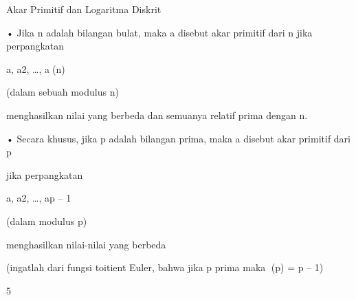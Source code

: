 \documentclass{article}
\begin{document}

Akar Primitif dan Logaritma Diskrit

• Jika n adalah bilangan bulat, maka a disebut akar primitif dari n jika perpangkatan 

a, a2, …, a(n)

(dalam sebuah modulus n) 

    menghasilkan nilai yang berbeda dan semuanya relatif prima dengan n.

• Secara khusus, jika p adalah bilangan prima, maka a disebut akar primitif dari p 

jika perpangkatan 

a, a2, …, ap – 1

(dalam modulus p)

menghasilkan nilai-nilai yang berbeda 

(ingatlah dari fungsi toitient Euler, bahwa jika p prima maka (p) = p – 1) 

5
\end{document}
